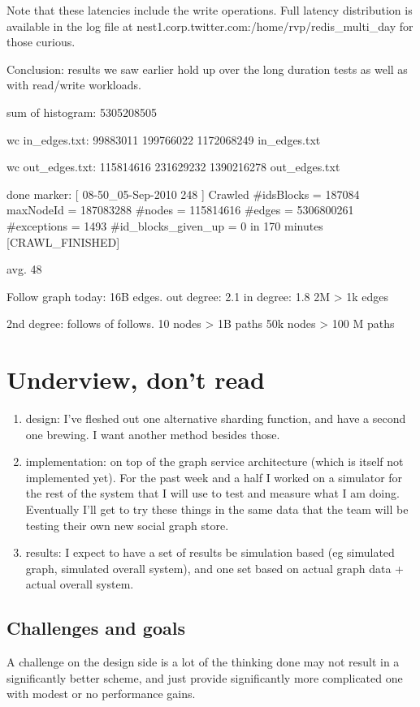 \documentclass{article}
\begin{document}
Note that these latencies include the write operations. Full latency distribution is available in the log file at nest1.corp.twitter.com:/home/rvp/redis_multi_day for those curious. 

Conclusion: results we saw earlier hold up over the long duration tests as well as with read/write workloads.

sum of histogram:
5305208505

wc in_edges.txt: 99883011  199766022 1172068249 in_edges.txt

wc out_edges.txt: 115814616  231629232 1390216278 out_edges.txt

done marker:
[ 08-50_05-Sep-2010 248 ] Crawled #idsBlocks = 187084 maxNodeId = 187083288 #nodes = 115814616 #edges = 5306800261 #exceptions = 1493 #id_blocks_given_up = 0 in 170 minutes [CRAWL_FINISHED]

avg. 48

Follow graph today:
16B edges.
out degree: 2.1
in degree: 1.8
2M > 1k edges


2nd degree: follows of follows. 10 nodes > 1B paths
50k nodes > 100 M paths




\section{Underview, don't read}
\begin{enumerate}
\item design: I've fleshed out one alternative sharding function, and have a second one brewing. I want another method besides those. 

\item implementation: on top of the graph service architecture (which is itself not implemented yet). For the past week and a half I  worked on a simulator
for the rest of the system that I will use to test and measure what I am doing. Eventually I'll get to try these things in the same data that the team will be testing their own new social graph store.

\item results: I expect to have a set of results be simulation based (eg simulated graph, simulated overall system),  and one set based on actual graph data + actual overall system.
\end{enumerate}
\subsection{Challenges and goals}
A challenge on the design side is a lot of the thinking done may not result in a significantly better scheme, and just provide significantly more complicated one with modest or no performance gains. 
\end{document}
